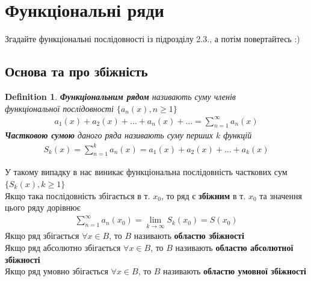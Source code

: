\documentclass[a4paper, 14pt]{extarticle}
\def\huge{\displaystyle}
\def\bigline{\vspace{5mm}\\}
\theoremstyle{theoremdd}
\theoremstyle{theoremdd}
\newtheorem{definition}[theorem]{Definition}
\theoremstyle{theoremdd}
\theoremstyle{theoremdd}
\theoremstyle{theoremdd}
\theoremstyle{theoremdd}
\theoremstyle{theoremdd}
\theoremstyle{theoremdd}
\begin{document}
\section{Функціональні ряди}
Згадайте функціональні послідовності із підрозділу 2.3., а потім повертайтесь :)

\subsection{Основа та про збіжність}
\begin{definition}
\textbf{Функціональним рядом} називають суму членів \\ функціональної послідовності $\{a_n(x), n \geq 1\}$
\begin{align*}
a_1(x) + a_2(x) + \dots + a_n(x) + \dots = \huge \sum_{n=1}^\infty a_n(x)
\end{align*}
\textbf{Частковою сумою} даного ряда називають суму перших $k$ функцій
\begin{align*}
S_k(x) = \sum_{n=1}^k a_n(x) = a_1(x) + a_2(x) + \dots + a_k(x)
\end{align*}
\end{definition}

У такому випадку в нас виникає функціональна послідовність часткових сум $\{S_k(x), k \geq 1\}$\\
Якщо така послідовність збігається в т. $x_0$, то ряд є \textbf{збіжним} в т. $x_0$ та значення цього ряду дорівнює
\begin{align*}
\sum_{n=1}^\infty a_n(x_0) = \lim_{k \to \infty} S_k(x_0) = S(x_0)
\end{align*}
Якщо ряд збігається $\forall x \in B$, то $B$ називають \textbf{областю збіжності}
\bigline
Якщо ряд абсолютно збігається $\forall x \in B$, то $B$ називають \textbf{областю абсолютної збіжності}
\bigline
Якщо ряд умовно збігається $\forall x \in B$, то $B$ називають \textbf{областю умовної збіжності}
\end{document}
